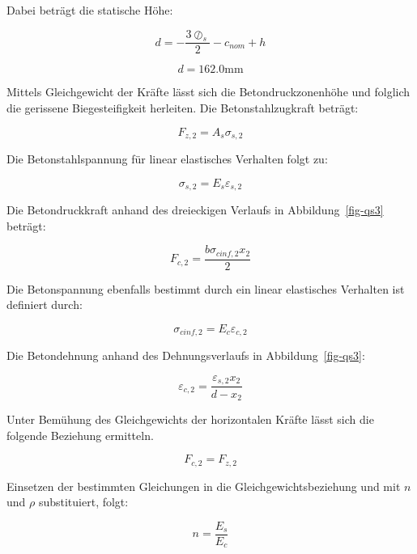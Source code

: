 \documentclass[
  letterpaper,
]{scrreprt}
\begin{document}
Dabei beträgt die statische Höhe:

\begin{equation}d = - \frac{3 \oslash_{s}}{2} - c_{nom} + h\end{equation}

\begin{equation}d = 162.0 \text{mm}\end{equation}

Mittels Gleichgewicht der Kräfte lässt sich die Betondruckzonenhöhe und
folglich die gerissene Biegesteifigkeit herleiten. Die
Betonstahlzugkraft beträgt:

\begin{equation}F_{z,2} = A_{s} \sigma_{s,2}\end{equation}

Die Betonstahlspannung für linear elastisches Verhalten folgt zu:

\begin{equation}\sigma_{s,2} = E_{s} \varepsilon_{s,2}\end{equation}

Die Betondruckkraft anhand des dreieckigen Verlaufs in
Abbildung~\ref{fig-qs3} beträgt:

\begin{equation}F_{c,2} = \frac{b \sigma_{c inf,2} x_{2}}{2}\end{equation}

Die Betonspannung ebenfalls bestimmt durch ein linear elastisches
Verhalten ist definiert durch:

\begin{equation}\sigma_{c inf,2} = E_{c} \varepsilon_{c,2}\end{equation}

Die Betondehnung anhand des Dehnungsverlaufs in Abbildung~\ref{fig-qs3}:

\begin{equation}\varepsilon_{c,2} = \frac{\varepsilon_{s,2} x_{2}}{d - x_{2}}\end{equation}

Unter Bemühung des Gleichgewichts der horizontalen Kräfte lässt sich die
folgende Beziehung ermitteln.

\begin{equation}F_{c,2} = F_{z,2}\end{equation}

Einsetzen der bestimmten Gleichungen in die Gleichgewichtsbeziehung und
mit \(n\) und \(\rho\) substituiert, folgt:

\begin{equation}n = \frac{E_{s}}{E_{c}}\end{equation}
\end{document}
